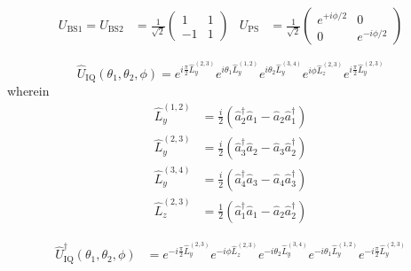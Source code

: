 \begin{align}
	U_\text{BS1}
	=
	U_\text{BS2}
	&=
	\frac{1}{\sqrt{2}}
	\begin{pmatrix}
		1 & 1 \\
		-1 & 1
	\end{pmatrix}
	&
	U_\text{PS}
	&=
	\frac{1}{\sqrt{2}}
	\begin{pmatrix}
		e^{+i\phi/2} & 0 \\
		0 & e^{-i\phi/2}
	\end{pmatrix}
\end{align}

\begin{equation}
	\hat{U}_\text{IQ}(\theta_1,\theta_2,\phi)
	=
	e^{i\frac{\pi}{2}\hat{L}_y^{(2,3)}}
	e^{i\theta_1\hat{L}_y^{(1,2)}}
	e^{i\theta_2\hat{L}_y^{(3,4)}}
	e^{i\phi\hat{L}_z^{(2,3)}}
	e^{i\frac{\pi}{2}\hat{L}_y^{(2,3)}}
\end{equation}
wherein
\begin{align}
	\hat{L}_y^{(1,2)}
	&=
	\frac{i}{2}
	\left(
		\hat{a}_2^\dagger
		\hat{a}_1
		-
		\hat{a}_2
		\hat{a}_1^\dagger
	\right)
	\\
	\hat{L}_y^{(2,3)}
	&=
	\frac{i}{2}
	\left(
		\hat{a}_3^\dagger
		\hat{a}_2
		-
		\hat{a}_3
		\hat{a}_2^\dagger
	\right)
	\\
	\hat{L}_y^{(3,4)}
	&=
	\frac{i}{2}
	\left(
		\hat{a}_4^\dagger
		\hat{a}_3
		-
		\hat{a}_4
		\hat{a}_3^\dagger
	\right)
	\\
	\hat{L}_z^{(2,3)}
	&=
	\frac{1}{2}
	\left(
		\hat{a}_1^\dagger
		\hat{a}_1
		-
		\hat{a}_2
		\hat{a}_2^\dagger
	\right)
\end{align}

\begin{equation}
	\begin{split}
		\hat{U}_\text{IQ}^\dagger(\theta_1,\theta_2,\phi)
		&=
		e^{-i\frac{\pi}{2}\hat{L}_y^{(2,3)}}
		e^{-i\phi\hat{L}_z^{(2,3)}}
		e^{-i\theta_2\hat{L}_y^{(3,4)}}
		e^{-i\theta_1\hat{L}_y^{(1,2)}}
		e^{-i\frac{\pi}{2}\hat{L}_y^{(2,3)}}
	\end{split}
\end{equation}

